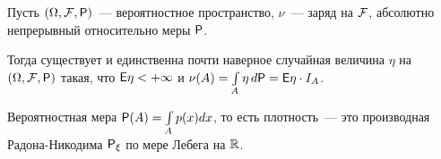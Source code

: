 \begin{theorem}
	Пусть $(\Omega, \F, \P)$~--- вероятностное пространство, $\nu$~--- заряд на $\F$, абсолютно непрерывный относительно меры $\P$. 
	
	Тогда существует и единственна почти наверное случайная величина $\eta$ на $(\Omega, \F, \P)$ такая, что $\E \eta < +\infty$ и $\nu(A) = \int\limits_A \eta \, d \P = \E \eta \cdot I_A$.
\end{theorem}

\begin{statement}
    Вероятностная мера $\P(A) = \int\limits_A p(x)dx$, то есть плотность~--- это производная Радона-Никодима $\P_{\xi}$ по мере Лебега на $\R$.
\end{statement}